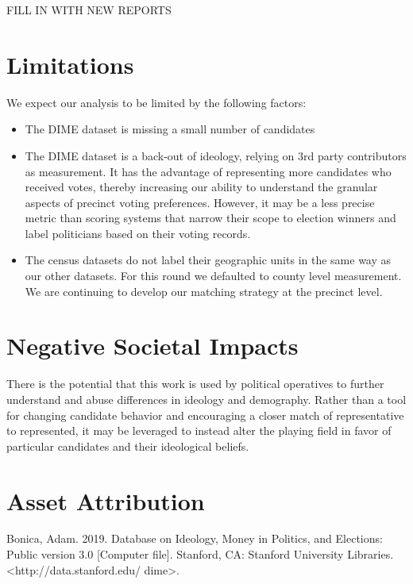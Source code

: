 \documentclass{article}
\begin{document}
FILL IN WITH NEW REPORTS


\section{Limitations}

We expect our analysis to be limited by the following factors:

\begin{itemize}

\item The DIME dataset is missing a small number of candidates

\item The DIME dataset is a back-out of ideology, relying on 3rd
party contributors as measurement. It has the advantage of
representing more candidates who received votes, thereby increasing
our ability to understand the granular aspects of precinct voting
preferences. However, it may be a less precise metric than scoring
systems that narrow their scope to election winners and label
politicians based on their voting records.

\item The census datasets do not label their geographic units 
in the same way as our other datasets. For this round we defaulted
to county level measurement. We are continuing to develop our 
matching strategy at the precinct level.
\end{itemize}

\section{Negative Societal Impacts}

There is the potential that this work is used by political operatives to
further understand and abuse differences in ideology and demography. Rather
than a tool for changing candidate behavior and encouraging a closer match of
representative to represented, it may be leveraged to instead alter the playing
field in favor of particular candidates and their ideological beliefs.

\section{Asset Attribution}


Bonica, Adam. 2019. Database on Ideology, Money in Politics, and Elections: Public version
3.0 [Computer file]. Stanford, CA: Stanford University Libraries. <http://data.stanford.edu/
dime>.
\end{document}

